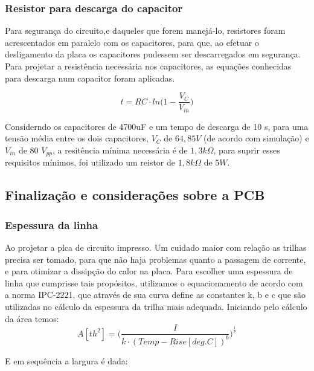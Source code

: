 \documentclass[a4paper,12pt,oneside,openany,table,xcdraw]{article}
\begin{document}
\subsubsection{Resistor para descarga do capacitor} \label{descarga}
Para segurança do circuito,e daqueles que forem manejá-lo, resistores foram acrescentados em paralelo com os capacitores, para que, ao efetuar o desligamento da placa os capacitores pudessem ser descarregados em segurança.
Para projetar a resistência necessária nos capacitores, as equações conhecidas para descarga num capacitor foram aplicadas.

\begin{equation}
t= RC \cdot ln\bigg( 1 - \frac{V_{C}}{V_{in}} \bigg) 
\end{equation}

Considerndo os capacitores de 4700uF e um tempo de descarga de 10 s, para uma tensão média entre os dois capacitores, $V_{C}$ de $64,85 V$ (de acordo com simulação) e $V_{in}$ de 80 $V_{pp}$, a resitência mínima necessária é de $1,3 k\Omega$, para suprir esses requisitos mínimos, foi utilizado um reistor de $1,8 k\Omega$ de $5W$. 



\vspace{0.3cm}
\subsection{Finalização e considerações sobre a PCB}

\subsubsection{Espessura da linha}
Ao projetar a plca de circuito impresso. Um cuidado maior com relação as trilhas precisa ser tomado, para que não haja problemas quanto a passagem de corrente, e para otimizar a dissipção do calor na placa. 
Para escolher uma espessura de linha que cumprisse tais propósitos, utilizamos o equacionamento de acordo com a norma IPC-2221, que através de sua curva define as constantes k, b e c que são utilizadas no cálculo da espessura da trilha mais adequada.
Iniciando pelo cálculo da área temos:
\begin{equation}
A [\mathit{th^{2}}] = \Bigg(\dfrac{I}{k \cdot (Temp-Rise [deg. C])^{b}}\Bigg)^{\frac{1}{c}}
 \end{equation}
 \vspace{0.3cm}

E em sequência a largura é dada:
\end{document}
